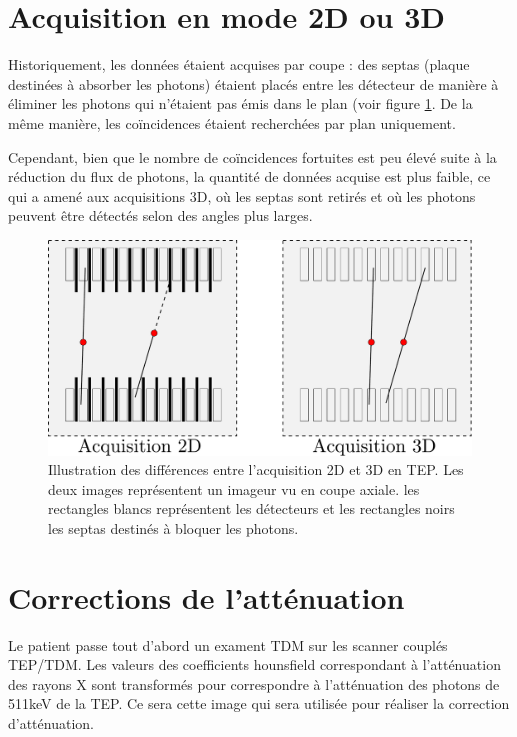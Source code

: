 	\section{Acquisition en mode 2D ou 3D}

Historiquement, les données étaient acquises par coupe : des septas (plaque destinées à absorber les photons) étaient placés entre les détecteur de manière à éliminer les photons qui n'étaient pas émis dans le plan (voir figure \ref{fig:2D3D}. De la même manière, les coïncidences étaient recherchées par plan uniquement.

Cependant, bien que le nombre de coïncidences fortuites est peu élevé suite à la réduction du flux de photons, la quantité de données acquise est plus faible, ce qui a amené aux acquisitions 3D, où les septas sont retirés et où les photons peuvent être détectés selon des angles plus larges.


\begin{figure}
\centering
\includegraphics[width=12cm]{images/2D3D}
\caption[Acquisitions 2D et 3D en TEP]{Illustration des différences entre l'acquisition 2D et 3D en TEP. Les deux images représentent un imageur vu en coupe axiale. les rectangles blancs représentent les détecteurs et les rectangles noirs les septas destinés à bloquer les photons. }
\label{fig:2D3D}
\end{figure}


	\section{Corrections de l'atténuation}

\label{CorrectionAttenuation}

Le patient passe tout d'abord un exament TDM sur les scanner couplés TEP/TDM. Les valeurs des coefficients hounsfield correspondant à l'atténuation des rayons X sont transformés pour correspondre à l'atténuation des photons de 511keV de la TEP. Ce sera cette image qui sera utilisée pour réaliser la correction d'atténuation. 

